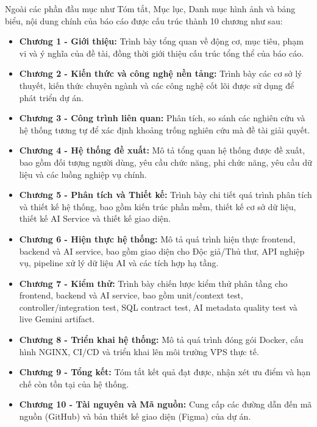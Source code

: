 Ngoài các phần đầu mục như Tóm tắt, Mục lục, Danh mục hình ảnh và bảng biểu, nội dung chính của báo cáo được cấu trúc thành 10 chương như sau:
\begin{itemize}
    \item \textbf{Chương 1 - Giới thiệu:} Trình bày tổng quan về động cơ, mục tiêu, phạm vi và ý nghĩa của đề tài, đồng thời giới thiệu cấu trúc tổng thể của báo cáo.

    \item \textbf{Chương 2 - Kiến thức và công nghệ nền tảng:} Trình bày các cơ sở lý thuyết, kiến thức chuyên ngành và các công nghệ cốt lõi được sử dụng để phát triển dự án.

    \item \textbf{Chương 3 - Công trình liên quan:} Phân tích, so sánh các nghiên cứu và hệ thống tương tự để xác định khoảng trống nghiên cứu mà đề tài giải quyết.

    \item \textbf{Chương 4 - Hệ thống đề xuất:} Mô tả tổng quan hệ thống được đề xuất, bao gồm đối tượng người dùng, yêu cầu chức năng, phi chức năng, yêu cầu dữ liệu và các luồng nghiệp vụ chính.

    \item \textbf{Chương 5 - Phân tích và Thiết kế:} Trình bày chi tiết quá trình phân tích và thiết kế hệ thống, bao gồm kiến trúc phần mềm, thiết kế cơ sở dữ liệu, thiết kế AI Service và thiết kế giao diện.

    \item \textbf{Chương 6 - Hiện thực hệ thống:} Mô tả quá trình hiện thực frontend, backend và AI service, bao gồm giao diện cho Độc giả/Thủ thư, API nghiệp vụ, pipeline xử lý dữ liệu AI và các tích hợp hạ tầng.

    \item \textbf{Chương 7 - Kiểm thử:} Trình bày chiến lược kiểm thử phân tầng cho frontend, backend và AI service, bao gồm unit/context test, controller/integration test, SQL contract test, AI metadata quality test và live Gemini artifact.

    \item \textbf{Chương 8 - Triển khai hệ thống:} Mô tả quá trình đóng gói Docker, cấu hình NGINX, CI/CD và triển khai lên môi trường VPS thực tế.

    \item \textbf{Chương 9 - Tổng kết:} Tóm tắt kết quả đạt được, nhận xét ưu điểm và hạn chế còn tồn tại của hệ thống.

    \item \textbf{Chương 10 - Tài nguyên và Mã nguồn:} Cung cấp các đường dẫn đến mã nguồn (GitHub) và bản thiết kế giao diện (Figma) của dự án.
\end{itemize}
